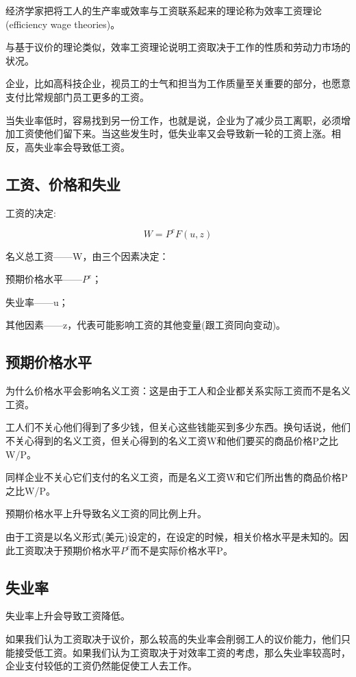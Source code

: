 \documentclass{article}
\begin{document}
经济学家把将工人的生产率或效率与工资联系起来的理论称为效率工资理论(efficiency wage theories)。

\hspace*{\fill}

与基于议价的理论类似，效率工资理论说明工资取决于工作的性质和劳动力市场的状况。

企业，比如高科技企业，视员工的士气和担当为工作质量至关重要的部分，也愿意支付比常规部门员工更多的工资。

当失业率低时，容易找到另一份工作，也就是说，企业为了减少员工离职，必须增加工资使他们留下来。当这些发生时，低失业率又会导致新一轮的工资上涨。相反，高失业率会导致低工资。

\subsection{工资、价格和失业}

工资的决定:

\[
W=P^eF(u,z)
\]

名义总工资——W，由三个因素决定：

预期价格水平——$ P^e $；

失业率——u；

其他因素——z，代表可能影响工资的其他变量(跟工资同向变动)。

\subsection{预期价格水平}

为什么价格水平会影响名义工资：这是由于工人和企业都关系实际工资而不是名义工资。

工人们不关心他们得到了多少钱，但关心这些钱能买到多少东西。换句话说，他们不关心得到的名义工资，但关心得到的名义工资W和他们要买的商品价格P之比W/P。

同样企业不关心它们支付的名义工资，而是名义工资W和它们所出售的商品价格P之比W/P。

预期价格水平上升导致名义工资的同比例上升。

由于工资是以名义形式(美元)设定的，在设定的时候，相关价格水平是未知的。因此工资取决于预期价格水平$ P^e $而不是实际价格水平P。

\subsection{失业率}

失业率上升会导致工资降低。

如果我们认为工资取决于议价，那么较高的失业率会削弱工人的议价能力，他们只能接受低工资。如果我们认为工资取决于对效率工资的考虑，那么失业率较高时，企业支付较低的工资仍然能促使工人去工作。
\end{document}
